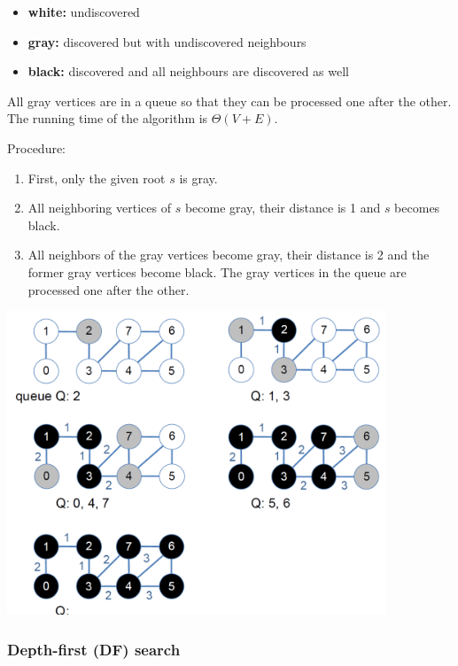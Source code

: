 \begin{itemize}
    \item \textbf{white:} undiscovered
    \item \textbf{gray:} discovered but with undiscovered neighbours
    \item \textbf{black:} discovered and all neighbours are discovered as well
\end{itemize}

All gray vertices are in a queue so that they can be processed one after the other. The running time of the algorithm is $\Theta(V+E)$.

Procedure:
\begin{enumerate}
    \item First, only the given root $s$ is gray.
    \item All neighboring vertices of $s$ become gray, their distance is 1 and $s$ becomes black.
    \item All neighbors of the gray vertices become gray, their distance is 2 and the former gray vertices become black. The gray vertices in the queue are processed one after the other.
\end{enumerate}

\begin{center}\includegraphics[width=0.85\textwidth]{img/graphs/BfSearch.png}\end{center}

%

\subsubsection{Depth-first (DF) search}

